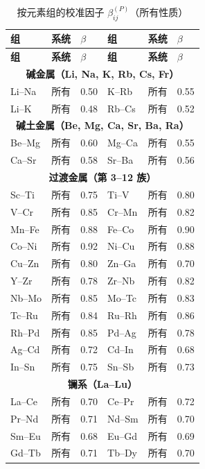 \documentclass[12pt,a4paper]{article}
\begin{document}
	\begin{longtable}{p{2.5cm} p{2.5cm} p{1.2cm} p{2.5cm} p{2.5cm} p{1.2cm}}
		\caption{按元素组的校准因子 $\beta_{ij}^{(P)}$（所有性质）}\label{tab:beta_group}\\
		\toprule
		\textbf{组} & \textbf{系统} & $\beta$ & \textbf{组} & \textbf{系统} & $\beta$ \\
		\midrule
		\endfirsthead
		\toprule
		\textbf{组} & \textbf{系统} & $\beta$ & \textbf{组} & \textbf{系统} & $\beta$ \\
		\midrule
		\endhead
		\multicolumn{6}{c}{\textbf{碱金属（Li, Na, K, Rb, Cs, Fr）}} \\
		Li–Na & 所有 & 0.50 & K–Rb & 所有 & 0.55 \\
		Li–K  & 所有 & 0.48 & Rb–Cs & 所有 & 0.52 \\
		\multicolumn{6}{c}{\textbf{碱土金属（Be, Mg, Ca, Sr, Ba, Ra）}} \\
		Be–Mg & 所有 & 0.60 & Mg–Ca & 所有 & 0.55 \\
		Ca–Sr & 所有 & 0.58 & Sr–Ba & 所有 & 0.56 \\
		\multicolumn{6}{c}{\textbf{过渡金属（第 3–12 族）}} \\
		Sc–Ti & 所有 & 0.75 & Ti–V & 所有 & 0.80 \\
		V–Cr  & 所有 & 0.85 & Cr–Mn & 所有 & 0.82 \\
		Mn–Fe & 所有 & 0.88 & Fe–Co & 所有 & 0.90 \\
		Co–Ni & 所有 & 0.92 & Ni–Cu & 所有 & 0.88 \\
		Cu–Zn & 所有 & 0.80 & Zn–Ga & 所有 & 0.70 \\
		Y–Zr  & 所有 & 0.78 & Zr–Nb & 所有 & 0.82 \\
		Nb–Mo & 所有 & 0.85 & Mo–Tc & 所有 & 0.83 \\
		Tc–Ru & 所有 & 0.84 & Ru–Rh & 所有 & 0.86 \\
		Rh–Pd & 所有 & 0.85 & Pd–Ag & 所有 & 0.78 \\
		Ag–Cd & 所有 & 0.72 & Cd–In & 所有 & 0.68 \\
		In–Sn & 所有 & 0.75 & Sn–Sb & 所有 & 0.73 \\
		\multicolumn{6}{c}{\textbf{镧系（La–Lu）}} \\
		La–Ce & 所有 & 0.70 & Ce–Pr & 所有 & 0.72 \\
		Pr–Nd & 所有 & 0.71 & Nd–Sm & 所有 & 0.70 \\
		Sm–Eu & 所有 & 0.68 & Eu–Gd & 所有 & 0.69 \\
		Gd–Tb & 所有 & 0.71 & Tb–Dy & 所有 & 0.70 \\

\end{longtable}
\end{document}

